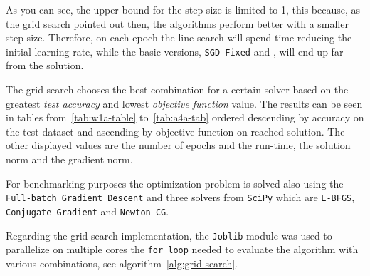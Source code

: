 As you can see, the upper-bound for the step-size is limited to \num{1}, this because, as the grid search pointed out then, the algorithms perform better with a smaller step-size. Therefore, on each epoch the line search will spend time reducing the initial learning rate, while the basic versions, \texttt{SGD-Fixed} and , will end up far from the solution.

The grid search chooses the best combination for a certain solver based on the greatest \emph{test accuracy} and lowest \emph{objective function} value. The results can be seen in tables from~\vref{tab:w1a-table} to~\ref{tab:a4a-tab} ordered descending by accuracy on the test dataset and ascending by objective function on reached solution. The other displayed values are the number of epochs and the run-time, the solution norm and the gradient norm.

For benchmarking purposes the optimization problem is solved also using the \texttt{Full-batch Gradient Descent} and three solvers from \texttt{SciPy} which are \texttt{L-BFGS}, \texttt{Conjugate Gradient} and \texttt{Newton-CG}.%

Regarding the grid search implementation, the \texttt{Joblib} module was used to parallelize on multiple cores the \texttt{for loop} needed to evaluate the algorithm with various combinations, see algorithm~\vref{alg:grid-search}.\par\smallskip




